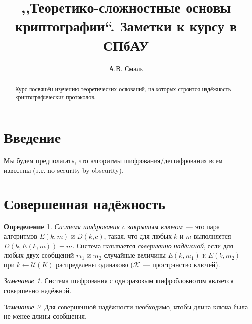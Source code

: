 \documentclass[12pt,a4paper]{article}
\title{,,Теоретико-сложностные основы криптографии``. Заметки к курсу в СПбАУ}
\author{А.В. Смаль}
\theoremstyle{definition}
\newtheorem{definition}{Определение}[section]
\theoremstyle{plain}
\theoremstyle{remark}
\newtheorem{remark}{Замечание}[section]
\begin{document}
\maketitle

\begin{abstract}
Курс посвящён изучению теоретических оснований, на которых строится
надёжность криптографических протоколов.
\end{abstract}

\tableofcontents
\newpage


\section*{Введение}
Мы будем предполагать, что алгоритмы шифрования/дешифрования всем известны (т.е. no security by obscurity).

\section{Совершенная надёжность}
\begin{definition}
\emph{Система шифрования с закрытым ключом}~--- это пара
алгоритмов $E(k, m)$ и $D(k, c)$, такая, что
для любых $k$ и $m$ выполняется $D(k, E(k, m)) = m$. Система называется \emph{совершенно надёжной}, если для любых двух сообщений $m_1$ и $m_2$ случайные величины $E(k, m_1)$ и $E(k, m_2)$ при $k\gets \mathcal U(K)$ распределены одинаково ($\mathcal K$~--- пространство ключей).
\end{definition}
\begin{remark}
Система шифрования с одноразовым шифроблокнотом является совершенно надёжной.
\end{remark}

\begin{remark}
Для совершенной надёжности необходимо, чтобы длина ключа была не менее длины сообщения.
\end{remark}
\end{document}
